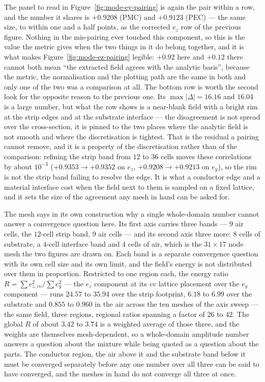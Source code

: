 The panel to read in Figure~\ref{fig:mode-ey-pairing} is again the pair within a row, and the number it shares
is $+0.9208$ (PMC) and $+0.9123$ (PEC) --- the same size, to within one and a half points, as the corrected
$e_z$ row of the previous figure. Nothing in the mis-pairing ever touched this component, so this is the value
the metric gives when the two things in it do belong together, and it is what makes
Figure~\ref{fig:mode-ez-pairing} legible:
$+0.92$ here and $+0.12$ there cannot both mean ``the extracted field agrees with the analytic basis'', because
the metric, the normalisation and the plotting path are the same in both and only one of the two was a
comparison at all. The bottom row is worth the second look for the opposite reason to the previous one. Its
$\max|\Delta| = 16.16$ and $16.04$ is a large number, but what the row shows is a near-blank field with a bright
rim at the strip edges and at the substrate interface --- the disagreement is not spread over the cross-section,
it is pinned to the two places where the analytic field is not smooth and where the discretisation is tightest.
That is the residual a pairing cannot remove, and it is a property of the discretisation rather than of the
comparison: refining the strip band from $12$ to $36$ cells moves these correlations by about $10^{-3}$
($+0.9353 \to +0.9352$ on $e_z$, $+0.9208 \to +0.9213$ on $e_y$), so the rim is not the strip band failing to
resolve the edge. It is what a conductor edge and a material interface cost when the field next to them is
sampled on a fixed lattice, and it sets the size of the agreement any mesh in hand can be asked for.

The mesh says in its own construction why a single whole-domain number cannot answer a convergence question
here. Its first axis carries three bands --- $9$ air cells, the $12$-cell strip band, $9$ air cells --- and its
second axis three more: $8$ cells of substrate, a $4$-cell interface band and $4$ cells of air, which is the
$31\times17$ node mesh the two figures are drawn on. Each band is a separate convergence question with its own
cell size and its own limit, and the field's energy is not distributed over them in proportion. Restricted to
one region each, the energy ratio $R = \sum e_{z,vv}^2 / \sum e_y^2$ --- the $e_z$ component at its $vv$
lattice placement over the $e_y$ component --- runs $24.57$ to $35.94$ over the strip footprint, $6.18$ to $6.99$
over the substrate and $0.855$ to $0.960$ in the air across the ten meshes of the axis sweep
--- the same field, three regions, regional ratios spanning a factor of $26$ to $42$. The global $R$ of about
$3.42$ to $3.74$ is a weighted average of those three, and the weights are themselves mesh-dependent, so a
whole-domain amplitude number answers a question about the mixture while being quoted as a question about the
parts. The conductor region, the air above it and the substrate band below it must be converged separately
before any one number over all three can be said to have converged, and the meshes in hand do not converge all
three at once.

